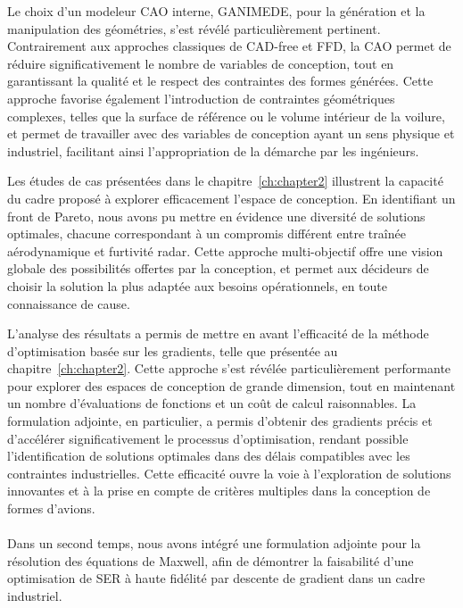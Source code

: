 Le choix d'un modeleur CAO interne, GANIMEDE, pour la génération et la manipulation des géométries, s'est révélé particulièrement pertinent. Contrairement aux approches classiques de CAD-free et FFD, la CAO permet de réduire significativement le nombre de variables de conception, tout en garantissant la qualité et le respect des contraintes des formes générées. Cette approche favorise également l'introduction de contraintes géométriques complexes, telles que la surface de référence ou le volume intérieur de la voilure, et permet de travailler avec des variables de conception ayant un sens physique et industriel, facilitant ainsi l'appropriation de la démarche par les ingénieurs.

Les études de cas présentées dans le chapitre~\ref{ch:chapter2} illustrent la capacité du cadre proposé à explorer efficacement l'espace de conception. En identifiant un front de Pareto, nous avons pu mettre en évidence une diversité de solutions optimales, chacune correspondant à un compromis différent entre traînée aérodynamique et furtivité radar. Cette approche multi-objectif offre une vision globale des possibilités offertes par la conception, et permet aux décideurs de choisir la solution la plus adaptée aux besoins opérationnels, en toute connaissance de cause.

L'analyse des résultats a permis de mettre en avant l'efficacité de la méthode d'optimisation basée sur les gradients, telle que présentée au chapitre~\ref{ch:chapter2}. Cette approche s'est révélée particulièrement performante pour explorer des espaces de conception de grande dimension, tout en maintenant un nombre d'évaluations de fonctions et un coût de calcul raisonnables. La formulation adjointe, en particulier, a permis d'obtenir des gradients précis et d'accélérer significativement le processus d'optimisation, rendant possible l'identification de solutions optimales dans des délais compatibles avec les contraintes industrielles. Cette efficacité ouvre la voie à l'exploration de solutions innovantes et à la prise en compte de critères multiples dans la conception de formes d'avions.

\paragraph{}
Dans un second temps, nous avons intégré une formulation adjointe pour la résolution des équations de Maxwell, afin de démontrer la faisabilité d'une optimisation de SER à haute fidélité par descente de gradient dans un cadre industriel.

